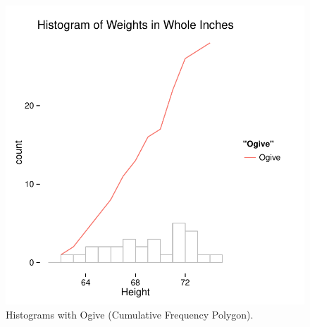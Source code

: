 \documentclass[nohyper,justified]{tufte-handout}\usepackage[]{graphicx}\usepackage[]{color}
\makeatletter
\def\maxwidth{ %
  \ifdim\Gin@nat@width>\linewidth
    \linewidth
  \else
    \Gin@nat@width
  \fi
}
\newenvironment{knitrout}{}{} %
\makeatother
\begin{document}
\begin{knitrout}
\color{fgcolor}\begin{figure}

{\centering \includegraphics[width=\maxwidth]{figure/graphics-ogive-1} 

}

\caption[Histograms with Ogive (Cumulative Frequency Polygon)]{Histograms with Ogive (Cumulative Frequency Polygon).}\label{fig:ogive}
\end{figure}


\end{knitrout}
\end{document}
